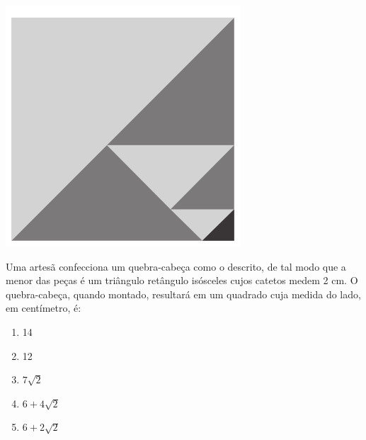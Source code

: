 \documentclass[12pt]{article}
\begin{document}
\begin{multicols}{2}
            \begin{center}
                \includegraphics[scale=0.6]{q40.png}
            \end{center}Uma artesã confecciona um quebra-cabeça como o descrito, de tal modo que a menor das peças é um triângulo retângulo isósceles cujos catetos medem 2 cm. O quebra-cabeça, quando montado, resultará em um quadrado cuja medida do lado, em centímetro, é:
            
            \begin{enumerate}[label=(\alph*), noitemsep]
                \item 14
                \item 12
                \item $7\sqrt{2}$ 
                \item $6+4\sqrt{2}$
                \item $6+2\sqrt{2}$ 
            \end{enumerate}
        
            
    \end{multicols}
    
\end{document}
